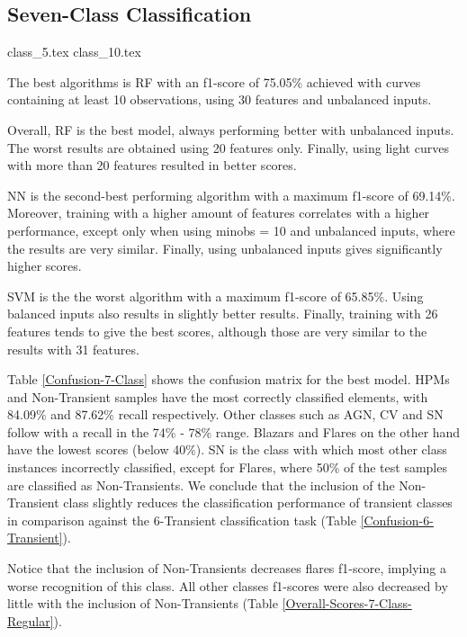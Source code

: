 \documentclass[a4paper,fleqn,usenatbib]{mnras}
\begin{document}
\subsection{Seven-Class Classification}

{class_5.tex}
{class_10.tex}

The best algorithms is RF with an f1-score of 75.05\% achieved with 
curves containing at least 10 observations, using 30 features and
unbalanced inputs.   

Overall, RF is the best model, always performing better with unbalanced
inputs.  
The worst results are obtained using 20 features only.
Finally, using light curves with more than 20 features resulted in
better scores.

NN is the second-best performing algorithm with a maximum f1-score of
69.14\%. 
Moreover, training with a higher amount of features correlates with a
higher performance, except only when using min\textunderscore obs = 10
and unbalanced inputs, where the results are very similar. 
Finally, using unbalanced inputs gives significantly higher scores.  

SVM is the the worst algorithm with a maximum f1-score of 65.85\%. 
Using balanced inputs also results in slightly better results. 
Finally, training with 26 features tends to give the best scores,
although those are very similar to the results with 31 features.  

Table \ref{Confusion-7-Class} shows the confusion matrix for the best
model. 
HPMs and Non-Transient samples have the most correctly classified elements, with 84.09\%
and 87.62\% recall respectively. 
Other classes such as AGN, CV and SN follow with a recall in the 74\%
- 78\% range. 
Blazars and Flares on the other hand have the lowest scores (below
40\%). 
SN is the class with which most other class instances incorrectly
classified, except for Flares, where 50\% of the test samples are
classified as Non-Transients. 
We conclude that the inclusion of the Non-Transient class slightly
reduces the  classification performance of transient classes in
comparison against the  6-Transient classification task
(Table \ref{Confusion-6-Transient}).  

Notice that the inclusion of Non-Transients decreases flares f1-score,
implying a worse recognition of this class. All other classes
f1-scores were also decreased by little with the inclusion of
Non-Transients (Table \ref{Overall-Scores-7-Class-Regular}). 
\end{document}
